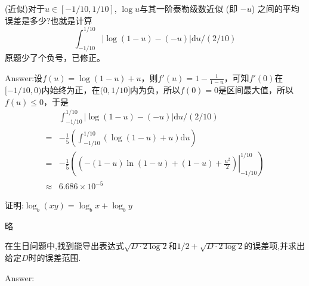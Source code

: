 \exer (近似)对于$u \in [-1/10, 1/10]$, $\log u$与其一阶泰勒级数近似 (即 $-u$) 之间的平均误差是多少?也就是计算
\[\int_{-1/10}^{1/10}|\log(1-u)-(-u)|\mathrm du/(2/10)\]
原题少了个负号，已修正。\par
Answer:设$f(u) = \log(1-u) + u$，则$f'(u) = 1 - \frac{1}{1 - u}$，可知$f'(0)$在$[-1/10,0)$内始终为正，在$(0,1/10]$内为负，所以$f(0)=0$是区间最大值，所以$f(u)\le 0$，于是
\begin{align*}
&\int_{-1/10}^{1/10}|\log(1-u)-(-u)|\mathrm du/(2/10) \\
=&-\frac{1}{5}\left(\int_{-1/10}^{1/10}(\log(1-u)+u)\mathrm du \right)\\
=&-\frac{1}{5}\left(\left.(-(1-u) \ln (1-u) + (1-u) + \frac{u^2}{2})\right|_{-1/10}^{1/10}\right) \\
\approx& 6.686\times10^{-5}
\end{align*}

\exer 证明:$\log_b(xy) = \log_b x + \log_b y$\par
略

\exer 在生日问题中,找到能导出表达式$\sqrt{D\cdot2\log2}$和$1/2+\sqrt{D\cdot2\log2}$的误差项,并求出给定$D$时的误差范围.\par
Answer: 
